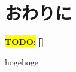\documentclass[submit,techrep,noauthor]{ipsj}
\newcommand{\todo}[1]{\colorbox{yellow}{{\bf TODO}:}{\color{red} {\textbf{[#1]}}}}
\begin{document}
\section{おわりに}
\label{sec:conclusion}

\todo{}

\begin{acknowledgment}
hogehoge
\end{acknowledgment}




\end{document}

